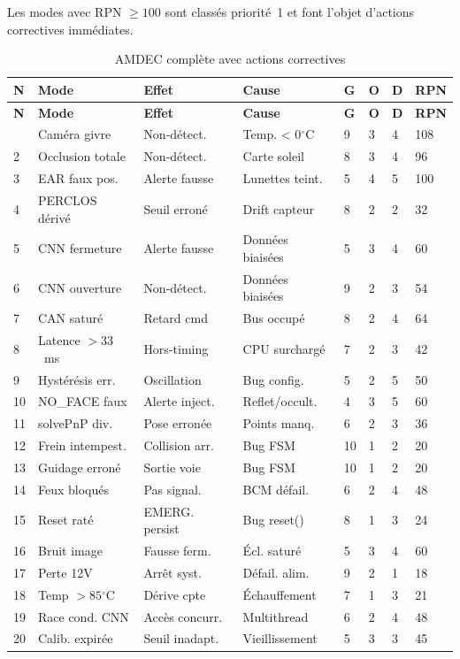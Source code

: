 \documentclass[12pt,a4paper]{report}
\newcommand{\degr}{\ensuremath{^{\circ}}}
\begin{document}
Les modes avec RPN $\geq 100$ sont class\'es priorit\'e~1 et font l'objet d'actions correctives imm\'ediates.

\begin{longtable}{C{0.4cm} L{3cm} L{2.5cm} L{2cm} C{0.6cm} C{0.6cm} C{0.6cm} C{0.8cm}}
\caption{AMDEC compl\`ete avec actions correctives}
\label{tab:amdec_full} \\
\toprule
\textbf{N} & \textbf{Mode} & \textbf{Effet} & \textbf{Cause} & \textbf{G} & \textbf{O} & \textbf{D} & \textbf{RPN} \\
\midrule
\endfirsthead
\toprule \textbf{N} & \textbf{Mode} & \textbf{Effet} & \textbf{Cause} & \textbf{G} & \textbf{O} & \textbf{D} & \textbf{RPN} \\
\midrule \endhead \bottomrule {}  & Cam\'era givre & Non-d\'etect. & Temp. < 0\degr C & 9 & 3 & 4 & 108 \\
2  & Occlusion totale & Non-d\'etect. & Carte soleil & 8 & 3 & 4 & 96 \\
3  & EAR faux pos. & Alerte fausse & Lunettes teint. & 5 & 4 & 5 & 100 \\
4  & PERCLOS d\'eriv\'e & Seuil erron\'e & Drift capteur & 8 & 2 & 2 & 32 \\
5  & CNN fermeture & Alerte fausse & Donn\'ees biais\'ees & 5 & 3 & 4 & 60 \\
6  & CNN ouverture & Non-d\'etect. & Donn\'ees biais\'ees & 9 & 2 & 3 & 54 \\
7  & CAN satur\'e & Retard cmd & Bus occup\'e & 8 & 2 & 4 & 64 \\
8  & Latence $>33$~ms & Hors-timing & CPU surcharg\'e & 7 & 2 & 3 & 42 \\
9  & Hyst\'er\'esis err. & Oscillation & Bug config. & 5 & 2 & 5 & 50 \\
10 & NO\_FACE faux & Alerte inject. & Reflet/occult. & 4 & 3 & 5 & 60 \\
11 & solvePnP div. & Pose erron\'ee & Points manq. & 6 & 2 & 3 & 36 \\
12 & Frein intempest. & Collision arr. & Bug FSM & 10 & 1 & 2 & 20 \\
13 & Guidage erron\'e & Sortie voie & Bug FSM & 10 & 1 & 2 & 20 \\
14 & Feux bloqu\'es & Pas signal. & BCM d\'efail. & 6 & 2 & 4 & 48 \\
15 & Reset rat\'e & EMERG. persist & Bug reset() & 8 & 1 & 3 & 24 \\
16 & Bruit image & Fausse ferm. & \'Ecl. satur\'e & 5 & 3 & 4 & 60 \\
17 & Perte 12V & Arr\^et syst. & D\'efail. alim. & 9 & 2 & 1 & 18 \\
18 & Temp $>85\degr$C & D\'erive cpte & \'Echauffement & 7 & 1 & 3 & 21 \\
19 & Race cond. CNN & Acc\`es concurr. & Multithread & 6 & 2 & 4 & 48 \\
20 & Calib. expir\'ee & Seuil inadapt. & Vieillissement & 5 & 3 & 3 & 45 \\
\bottomrule
\end{longtable}
\end{document}
